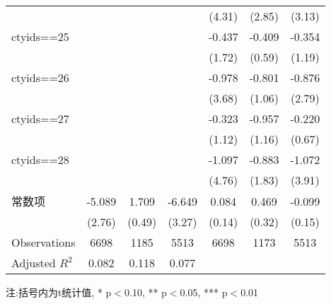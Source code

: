 \begin{table}[htbp]
\begin{center}
\begin{threeparttable}
\begin{tabular}{l*{6}{c}}
                &                  &                  &                  &   (4.31)         &   (2.85)         &   (3.13)         \\
ctyids==25      &                  &                  &                  &   -0.437\sym{*}  &   -0.409         &   -0.354         \\
                &                  &                  &                  &   (1.72)         &   (0.59)         &   (1.19)         \\
ctyids==26      &                  &                  &                  &   -0.978\sym{***}&   -0.801         &   -0.876\sym{***}\\
                &                  &                  &                  &   (3.68)         &   (1.06)         &   (2.79)         \\
ctyids==27      &                  &                  &                  &   -0.323         &   -0.957         &   -0.220         \\
                &                  &                  &                  &   (1.12)         &   (1.16)         &   (0.67)         \\
ctyids==28      &                  &                  &                  &   -1.097\sym{***}&   -0.883\sym{*}  &   -1.072\sym{***}\\
                &                  &                  &                  &   (4.76)         &   (1.83)         &   (3.91)         \\
常数项          &   -5.089\sym{***}&    1.709         &   -6.649\sym{***}&    0.084         &    0.469         &   -0.099         \\
                &   (2.76)         &   (0.49)         &   (3.27)         &   (0.14)         &   (0.32)         &   (0.15)         \\
\midrule
Observations    &     6698         &     1185         &     5513         &     6698         &     1173         &     5513         \\
Adjusted \(R^{2}\)&    0.082         &    0.118         &    0.077         &                  &                  &                  \\
\bottomrule
\end{tabular}
\begin{tablenotes}
\footnotesize
\item 注:括号内为t统计值, * p$<$0.10, ** p$<$0.05, *** p$<$0.01
\end{tablenotes}
\end{threeparttable}
\end{center}
\end{table}
